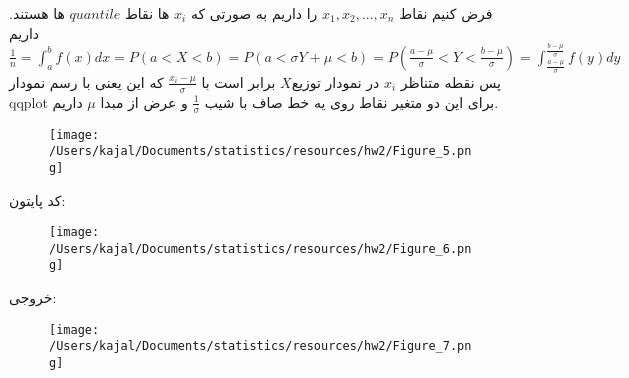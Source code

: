 \problem{}
\subproblem{}
فرض کنیم نقاط $x_1,x_2,...,x_n$ را داریم به صورتی که $x_i$ ها نقاط $quantile$ ها هستند.
داریم $\frac{1}{n} = \int_{a}^{b} f(x)dx = P(a<X<b) = P(a<\sigma Y +\mu<b) = P(\frac{a-\mu}{\sigma}<Y<\frac{b-\mu}{\sigma}) = \int_{\frac{a-\mu}{\sigma}}^{\frac{b-\mu}{\sigma}} f(y)dy$
پس نقطه متناظر $x_i$   در نمودار توزیع$X$ برابر است با $\frac{x_i-\mu}{\sigma}$ که این یعنی با رسم نمودار 
qqplot برای این دو متغیر نقاط روی یه خط صاف با شیب $\frac{1}{\sigma}$ و عرض از مبدا $\mu$ داریم.
\begin{figure}[H]
	\centering
	\texttt{[image: /Users/kajal/Documents/statistics/resources/hw2/Figure\_5.png]}
\end{figure}
\subproblem{}
کد پایتون:
\begin{figure}[H]
	\centering
	\texttt{[image: /Users/kajal/Documents/statistics/resources/hw2/Figure\_6.png]}
\end{figure}
خروجی:
\begin{figure}[H]
	\centering
	\texttt{[image: /Users/kajal/Documents/statistics/resources/hw2/Figure\_7.png]}
\end{figure}
